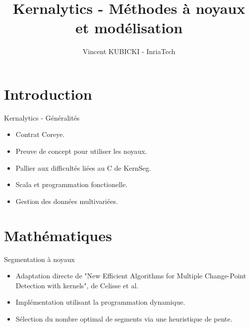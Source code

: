 \documentclass{beamer}
\title[Kernalytics]{Kernalytics - Méthodes à noyaux et modélisation}
\author[VK]{Vincent KUBICKI - InriaTech}
\institute[Inria]{Inria Lille - Nord Europe}
\begin{document}
\begin{frame}[plain]
	\titlepage
\end{frame}

\section{Introduction}

\begin{frame}{Kernalytics - Généralités}
	\begin{itemize}
		\item Contrat Coreye.
		\item Preuve de concept pour utiliser les noyaux.
		\item Pallier aux difficultés liées au C de KernSeg.
		\item Scala et programmation fonctionelle.
		\item Gestion des données multivariées.
	\end{itemize}
\end{frame}

\section{Mathématiques}

\begin{frame}{Segmentation à noyaux}
	\begin{itemize}
		\item Adaptation directe de "New Efficient Algorithms for Multiple Change-Point Detection with kernels", de Celisse et al.
		\item Implémentation utilisant la programmation dynamique.
		\item Sélection du nombre optimal de segments via une heuristique de pente.
	\end{itemize}
\end{frame}
\end{document}
